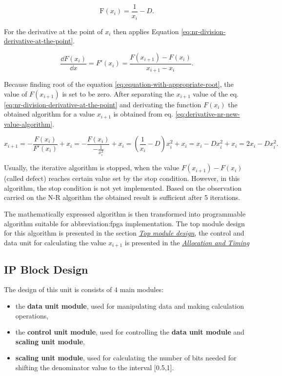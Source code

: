 \documentclass[a4paper, twoside, 11pt]{article}
\begin{document}
\begin{equation}\label{eq:equation-with-appropriate-root}
  \text{F} (x_i) = \frac{1}{x_i} - D.
\end{equation}

\noindent For the derivative at the point of $x_i$ then applies Equation \ref{eq:nr-division-derivative-at-the-point}.

\begin{equation}\label{eq:nr-division-derivative-at-the-point}
  \frac{\dd F(x_i)}{\dd x} = F'(x_i) = \frac{F (x_{i+1}) - F (x_i)}{x_{i+1}-x_i}.
\end{equation}

\noindent Because finding root of the equation \ref{eq:equation-with-appropriate-root}, the value of $F (x_{i+1})$ is set to be zero. After separating the $x_{i+1}$ value of the eq. \ref{eq:nr-division-derivative-at-the-point} and derivating the function $F (x_i)$ the obtained algorithm for a value $x_{i+1}$ is obtained from eq. \ref{eq:derivative-nr-new-value-algorithm}.\par

\begin{equation}\label{eq:derivative-nr-new-value-algorithm}
  x_{i+1} = -\frac{F (x_i)}{F' (x_i)} + x_i = - \frac{F (x_i)}{-\frac{1}{x_i^2}} + x_i = (\frac{1}{x_i} - D) x_i^2 + x_i = x_i - D x_i^2 + x_i = 2 x_i - D x_i^2.
\end{equation}

Usually, the iterative algorithm is stopped, when the value $F(x_{i+1}) - F(x_i)$ (called defect) reaches certain value set by the stop condition. However, in this algorithm, the stop condition is not yet implemented. Based on the observation carried on the N-R algorithm the obtained result is sufficient after 5 iterations.

The mathematically expressed algorithm is then transformed into programmable algorithm suitable for \gls{abbreviation:fpga} implementation. The top module design for this algorithm is presented in the section \hyperref[subsubsec:division-top-module-design]{\textit{Top module design}}, the control and data unit for calculating the value $x_{i+1}$ is presented in the \hyperref[subsubsec:division-allocation-and-timing]{\textit{Allocation and Timing}}

\subsection{IP Block Design}\label{subsec:division-ip-block-design}
The design of this unit is consists of 4 main modules:
\begin{itemize}
  \item the \textbf{data unit module}, used for manipulating data and making calculation operations,
  \item the \textbf{control unit module}, used for controlling the \textbf{data unit module} and \textbf{scaling unit module},
  \item \textbf{scaling unit module}, used for calculating the number of bits needed for shifting the denominator value to the interval [0.5,1].
\end{itemize}
\end{document}

